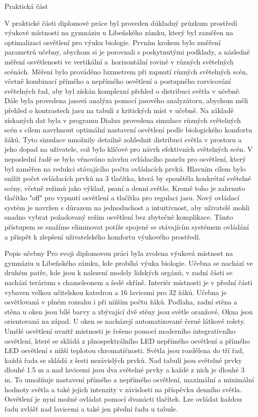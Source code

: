 \chap Praktická část

V praktické části diplomové práce byl proveden důkladný průzkum prostředí výukové místnosti na gymnáziu u Libeňského zámku, který byl zaměřen na optimalizaci osvětlení pro výuku biologie. 
Prvním krokem bylo změření parametrů učebny, abychom si je porovnali s poskytnutými podklady, a následně měření osvětlenosti ve vertikální a~horizontální rovině v různých světelných scénách. 
Měření bylo prováděno luxmetrem při zapnutí různých světelných scén, včetně kombinací přímého a nepřímého osvětlení a postupného rozvicování světelných řad,
 aby byl získán komplexní přehled o distribuci světla v učebně.
\medskip
Dále byla provedena jasová analýza pomocí jasového analyzátoru, abychom měli přehled o kontrastech jasu na tabuli z kritických míst v učebně.
\medskip
Na základě získaných dat byla v programu Dialux provedena simulace různých světelných scén s cílem navrhnout optimální nastavení osvětlení podle biologického komfortu žáků. 
Tyto simulace umožnily detailně zohlednit distribuci světla v prostoru a jeho dopad na uživatele, což bylo klíčové pro návrh efektivních světelných scén.
\medskip
V neposlední řadě se bylo věnováno návrhu ovládacího panelu pro osvětlení, který byl zaměřen na redukci stávajícího počtu ovládacích prvků. 
\medskip
Hlavním cílem bylo snížit počet ovládacích prvků na 3 tlačítka, která by spouštěla konkrétní světelné scény, včetně režimů jako výklad, psaní a denní světlo. Kromě toho je zahrnuto tlačítko "off" pro vypnutí osvětlení a tlačítka pro regulaci jasu.
\medskip
Nový ovládací systém je navržen s důrazem na jednoduchost a intuitivnost, aby uživatelé mohli snadno vybrat požadovaný režim osvětlení bez zbytečné komplikace. Tímto přístupem se snažíme eliminovat potíže spojené se stávajícím systémem ovládání a přispět k zlepšení uživatelského komfortu výukového prostředí.

\sec Popis učebny
Pro svoji diplomovou práci byla zvolena výuková místnost na gymnáziu u Libeňského zámku, kde probíhá výuka biologie. Učebna se nachází ve druhém patře, kde jsou k nalezení modely lidských orgánů, v zadní části se nachází terárium s chameleonem a šedé skříně. Interiér místnosti je v přední části vybaven velkou učitelskou katedrou a 16 lavicemi pro 32 žáků. Učebna je osvětlovaná v plném rozsahu i při nižším počtu žáků. Podlaha, zadní stěna a stěna u oken jsou bílé barvy a zbývající dvě stěny jsou světle oranžové. Okna jsou orientovaná na západ. U oken se nacházejí automatizované černé látkové rolety.
\medskip
Umělé osvětlení uvnitř místnosti je řešeno pomocí moderního integrativního osvětlení, které se skládá z plnospektrálního LED nepřímého osvětlení a přímého LED osvětlení s nižší teplotou chromatičnosti.
Světla jsou rozdělena do tří řad, každá řada se skládá z šesti nezávislých prvků. 
Nad tabulí jsou světelné prvky dlouhé 1.5 m a nad lavicemi jsou dva světelné prvky a každé z nich je dlouhé 3 m. 
To umožňuje nastavení přímého a nepřímého osvětlení, maximální a minimální hodnoty světla a také jejich intenzity v závislosti na příspěvku denního světla.
Osvětlení je nyní možné ovládat pomocí dvanácti tlačítek. Lze ovládat každou řadu zvlášť nad lavicemi a také jen přední řadu u tabule. 


